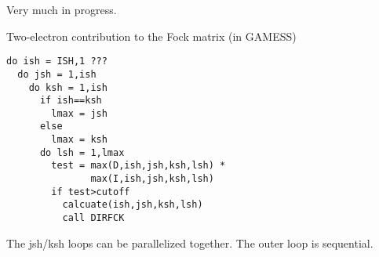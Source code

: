 Very much in progress.

Two-electron contribution to the Fock matrix (in GAMESS)

\begin{verbatim}
do ish = ISH,1 ???
  do jsh = 1,ish
    do ksh = 1,ish
      if ish==ksh
        lmax = jsh
      else
        lmax = ksh
      do lsh = 1,lmax
        test = max(D,ish,jsh,ksh,lsh) *
               max(I,ish,jsh,ksh,lsh)
        if test>cutoff
          calcuate(ish,jsh,ksh,lsh)
          call DIRFCK
\end{verbatim}

The jsh/ksh loops can be parallelized together.
The outer loop is sequential.

